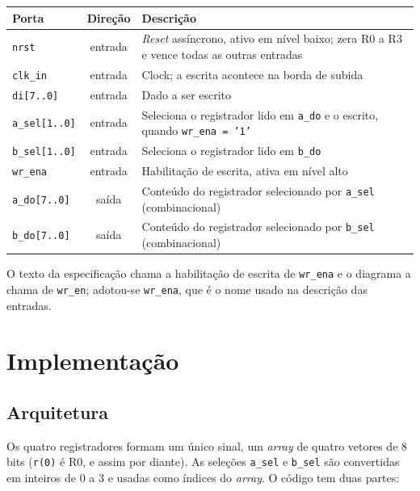\begin{quadro}[htb]
  \caption{Portas do banco de registradores.}
  \label{quad:portas-reg-bank}
  \centering
  \begin{tabular}{lcp{9cm}}
    \hline
    Porta & Direção & Descrição \\ \hline
    \texttt{nrst} & entrada & \textit{Reset} assíncrono, ativo em nível baixo; zera R0 a R3 e vence todas as outras entradas \\
    \texttt{clk\_in} & entrada & Clock; a escrita acontece na borda de subida \\
    \texttt{di[7..0]} & entrada & Dado a ser escrito \\
    \texttt{a\_sel[1..0]} & entrada & Seleciona o registrador lido em \texttt{a\_do} e o escrito, quando \texttt{wr\_ena = '1'} \\
    \texttt{b\_sel[1..0]} & entrada & Seleciona o registrador lido em \texttt{b\_do} \\
    \texttt{wr\_ena} & entrada & Habilitação de escrita, ativa em nível alto \\
    \texttt{a\_do[7..0]} & saída & Conteúdo do registrador selecionado por \texttt{a\_sel} (combinacional) \\
    \texttt{b\_do[7..0]} & saída & Conteúdo do registrador selecionado por \texttt{b\_sel} (combinacional) \\ \hline
  \end{tabular}
\end{quadro}

O texto da especificação chama a habilitação de escrita de \texttt{wr\_ena} e o diagrama a chama de \texttt{wr\_en}; adotou-se \texttt{wr\_ena}, que é o nome usado na descrição das entradas.

\section{Implementação}

\subsection{Arquitetura}

Os quatro registradores formam um único sinal, um \textit{array} de quatro vetores de 8 bits (\texttt{r(0)} é R0, e assim por diante). As seleções \texttt{a\_sel} e \texttt{b\_sel} são convertidas em inteiros de 0 a 3 e usadas como índices do \textit{array}. O código tem duas partes:

